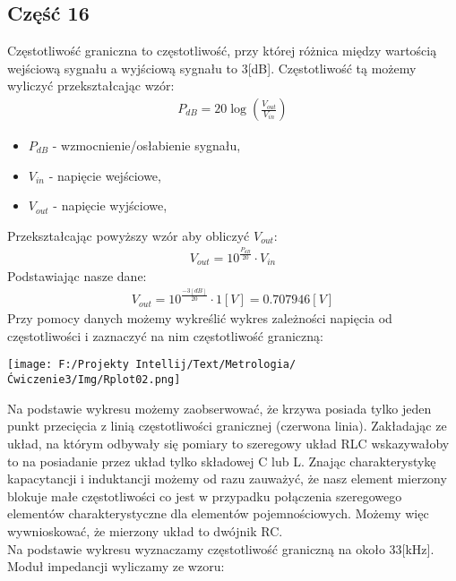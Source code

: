 \documentclass[11pt]{article}
\begin{document}
    \subsection*{Część 16}
    Częstotliwość graniczna to częstotliwość, przy której różnica między wartością
    wejściową sygnału a wyjściową sygnału to 3[dB]. Częstotliwość tą możemy wyliczyć przekształcając wzór:
    \begin{gather*}
        P_{dB}=20\log(\frac{V_{out}}{V_{in}})
    \end{gather*}
    {\footnotesize
        \begin{itemize}
            \setlength\itemsep{0em}
            \item[] \boldmath$P_{dB}$ - wzmocnienie/osłabienie sygnału,
            \item[] \boldmath$V_{in}$ - napięcie wejściowe,
            \item[] \boldmath$V_{out}$ - napięcie wyjściowe,
        \end{itemize}}
    \noindent Przekształcając powyższy wzór aby obliczyć $V_{out}$:
    \begin{gather*}
        V_{out}=10^{\frac{P_{dB}}{20}}\cdot V_{in}
    \end{gather*}
    Podstawiając nasze dane:
    \begin{gather*}
        V_{out}=10^{\frac{-3[dB]}{20}}\cdot 1[V]=0.707946[V]
    \end{gather*}
    Przy pomocy danych możemy wykreślić wykres zależności napięcia od częstotliwości i zaznaczyć na nim częstotliwość graniczną:
    \begin{center}
        \texttt{[image: F:/Projekty Intellij/Text/Metrologia/Ćwiczenie3/Img/Rplot02.png]}
    \end{center}
    \par Na podstawie wykresu możemy zaobserwować, że krzywa posiada tylko jeden punkt przecięcia z linią częstotliwości granicznej (czerwona linia).
    Zakładając ze układ, na którym odbywały się pomiary to szeregowy układ RLC wskazywałoby to na posiadanie przez układ tylko składowej C lub L.
    Znając charakterystykę kapacytancji i induktancji możemy od razu zauważyć, że nasz element mierzony blokuje małe częstotliwości co jest w przypadku
    połączenia szeregowego elementów charakterystyczne dla elementów pojemnościowych. Możemy więc wywnioskować, że mierzony układ to dwójnik RC.\\
    \indent Na podstawie wykresu wyznaczamy częstotliwość graniczną na około 33[kHz].
    Moduł impedancji wyliczamy ze wzoru:
\end{document}
